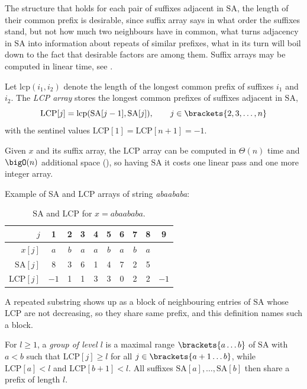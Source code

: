 

The structure that holds for each pair of suffixes adjacent in \(\mathrm{SA}\), the length of their common prefix is desirable, since suffix array says in what order the suffixes stand, but not how much two neighbours have in common, what turns adjacency in \(\mathrm{SA}\) into information about repeats of similar prefixes, what in its turn will boil down to the fact that desirable factors are among them. Suffix arrays may be computed in linear time, see .
\begin{definition}
\label{def:lcp-array}
    Let \(\mathrm{lcp}(i_1, i_2)\) denote the length of the longest common
    prefix of suffixes \(i_1\) and \(i_2\). The \emph{LCP array} stores the
    longest common prefixes of suffixes adjacent in \(\mathrm{SA}\),
    \[
      \mathrm{LCP}[j] = \mathrm{lcp}(\mathrm{SA}[j-1], \mathrm{SA}[j]),
      \qquad j \in \brackets{2, 3, \ldots, n}
    \]
    with the sentinel values \(\mathrm{LCP}[1] = \mathrm{LCP}[n+1] = -1\).
\end{definition}

Given \(x\) and its suffix array, the \(\mathrm{LCP}\) array can be computed in \(\Theta(n)\) time and \(\bigO(n)\) additional space (\cite{kasai2001}), so having \(\mathrm{SA}\) it costs one linear pass and one more integer array.

\noindent Example of SA and LCP arrays of string \emph{abaababa}:
\begin{table}[H]
    \centering
    \begin{tabular}{r|ccccccccc}
        \toprule
        \(j\)                & 1  & 2 & 3 & 4 & 5 & 6 & 7 & 8 & 9 \\
        \midrule
        \(x[j]\)             & \(a\) & \(b\) & \(a\) & \(a\) & \(b\) & \(a\) & \(b\) & \(a\) & \\
        \(\mathrm{SA}[j]\)   & 8  & 3 & 6 & 1 & 4 & 7 & 2 & 5 & \\
        \(\mathrm{LCP}[j]\)  & \(-1\) & 1 & 1 & 3 & 3 & 0 & 2 & 2 & \(-1\) \\
        \bottomrule
    \end{tabular}
    \caption{\(\mathrm{SA}\) and \(\mathrm{LCP}\) for \(x = abaababa\).}
    \label{tab:sa-lcp-example}
\end{table}

A repeated substring shows up as a block of neighbouring entries of \(\mathrm{SA}\) whose \(\mathrm{LCP}\) are not decreasing, so they share same prefix, and this definition names such a block.
\begin{definition}
\label{def:lcp-group}
    For \(l \geq 1\), a \emph{group of level \(l\)} is a maximal range \(\brackets{a \ldots b}\) of \(\mathrm{SA}\) with \(a < b\) such that \(\mathrm{LCP}[j] \geq l\) for all \(j \in \brackets{a+1 \ldots b}\), while \(\mathrm{LCP}[a] < l\) and \(\mathrm{LCP}[b+1] < l\). All suffixes \(\mathrm{SA}[a], \ldots, \mathrm{SA}[b]\) then share a prefix of length \(l\).
\end{definition}

